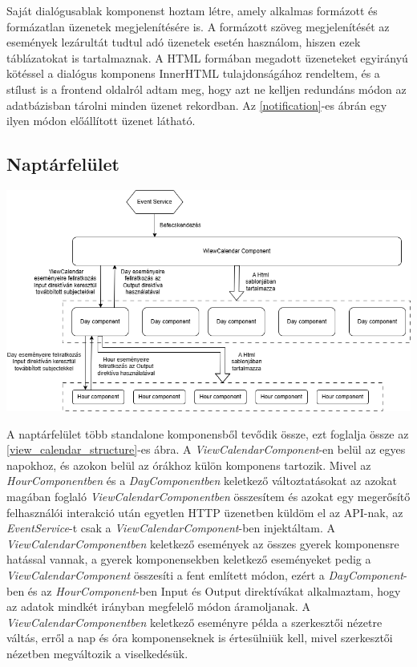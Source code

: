 \documentclass[a4paper,12pt]{report}
\theoremstyle{definition}
\theoremstyle{remark}
\begin{document}
Saját dialógusablak komponenst hoztam létre, amely alkalmas formázott és formázatlan üzenetek megjelenítésére is. A formázott szöveg megjelenítését az események lezárultát tudtul adó üzenetek esetén használom, hiszen ezek táblázatokat is tartalmaznak.  A HTML formában megadott üzeneteket egyirányú kötéssel a dialógus komponens InnerHTML tulajdonságához rendeltem, és a stílust is a frontend oldalról adtam meg, hogy azt ne kelljen redundáns módon az adatbázisban tárolni minden üzenet rekordban. Az \ref{notification}-es ábrán egy ilyen módon előállított üzenet látható.

	\subsection{Naptárfelület}

\begin{center}
\includegraphics[width=150mm]{view_calendar_structure}
\captionsetup{width=0.8\linewidth}
\label{view_calendar_structure}
\end{center}

A naptárfelület több standalone komponensből tevődik össze, ezt foglalja össze az \ref{view_calendar_structure}-es ábra. A \textit{ViewCalendarComponent}-en belül az egyes napokhoz, és azokon belül az órákhoz külön komponens tartozik. Mivel az \textit{HourComponentben} és a\textit{ DayComponentben} keletkező változtatásokat az azokat magában foglaló \textit{ViewCalendarComponentben} összesítem és azokat egy megerősítő felhasználói interakció után egyetlen HTTP üzenetben küldöm el az API-nak, az \textit{EventService}-t csak a \textit{ViewCalendarComponent}-ben injektáltam. A \textit{ViewCalendarComponentben} keletkező események az összes gyerek komponensre hatással vannak, a gyerek komponensekben keletkező eseményeket pedig a \textit{ViewCalendarComponent} összesíti a fent említett módon, ezért a \textit{DayComponent}-ben és az \textit{HourComponent}-ben Input és Output direktívákat alkalmaztam, hogy az adatok mindkét irányban megfelelő módon áramoljanak. A \textit{ViewCalendarComponentben} keletkező eseményre példa a szerkesztői nézetre váltás, erről a nap és óra komponenseknek is értesülniük kell, mivel szerkesztői nézetben megváltozik a viselkedésük.
\end{document}

